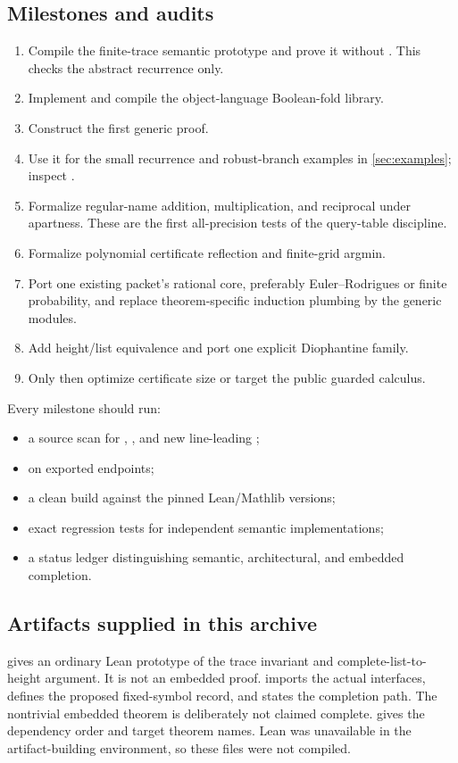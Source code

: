 \subsection{Milestones and audits}

\begin{enumerate}
\item Compile the finite-trace semantic prototype and prove it without
      .  This checks the abstract recurrence only.
\item Implement and compile the object-language Boolean-fold library.
\item Construct the first generic  proof.
\item Use it for the small recurrence and robust-branch examples in
      \cref{sec:examples}; inspect .
\item Formalize regular-name addition, multiplication, and reciprocal under
      apartness.  These are the first all-precision tests of the query-table
      discipline.
\item Formalize polynomial certificate reflection and finite-grid argmin.
\item Port one existing packet's rational core, preferably Euler--Rodrigues or
      finite probability, and replace theorem-specific induction plumbing by
      the generic modules.
\item Add height/list equivalence and port one explicit Diophantine family.
\item Only then optimize certificate size or target the public guarded
      calculus.
\end{enumerate}

Every milestone should run:
\begin{itemize}
\item a source scan for , , and new line-leading
      ;
\item {} on exported endpoints;
\item a clean build against the pinned Lean/Mathlib versions;
\item exact regression tests for independent semantic implementations;
\item a status ledger distinguishing semantic, architectural, and embedded
      completion.
\end{itemize}

\subsection{Artifacts supplied in this archive}

 gives an ordinary Lean prototype of the
trace invariant and complete-list-to-height argument.  It is not an embedded
proof.   imports the actual
 interfaces, defines the proposed fixed-symbol record, and
states the completion path.  The nontrivial embedded theorem is deliberately
not claimed complete.   gives the dependency order and
target theorem names.  Lean was unavailable in the artifact-building
environment, so these files were not compiled.

